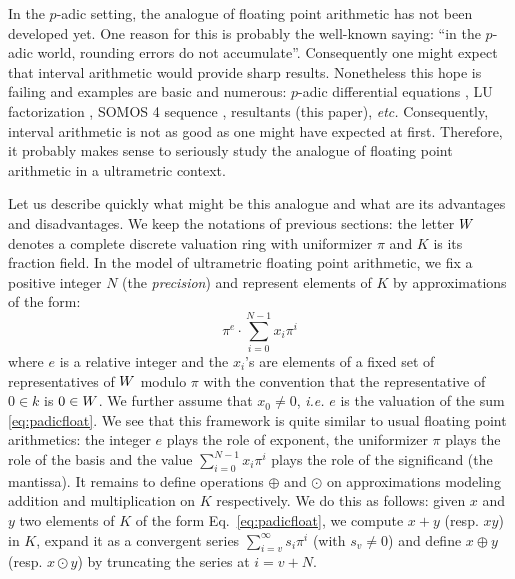 \documentclass{article}
\begin{document}
In the $p$-adic setting, the analogue of floating point arithmetic has 
not been developed yet. One reason for this is probably the well-known 
saying: ``in the $p$-adic world, rounding errors do not accumulate''. 
Consequently one might expect that interval arithmetic would provide 
sharp results. Nonetheless this hope is failing and examples are basic 
and numerous: $p$-adic differential equations \cite{bostan, padicdiff}, 
LU factorization \cite{LU}, SOMOS 4 sequence \cite{padicprec}, 
resultants (this paper), \emph{etc.} Consequently, interval arithmetic 
is not as good as one might have expected at first. Therefore, it 
probably makes sense to seriously study the analogue of floating point 
arithmetic in a ultrametric context.

Let us describe quickly what might be this analogue and what are its
advantages and disadvantages. We keep the notations of previous
sections: the letter $W$ denotes a complete discrete valuation ring
with uniformizer $\pi$ and $K$ is its fraction field.
In the model of ultrametric floating point arithmetic, we fix a
positive integer $N$ (the \emph{precision}) and represent elements 
of $K$ by approximations of the form:
\begin{equation}
\label{eq:padicfloat}
\pi^e \cdot \sum_{i=0}^{N-1} x_i \pi^i
\end{equation}
where $e$ is a relative integer and the $x_i$'s are elements of a fixed 
set of representatives of $W$ modulo $\pi$ with the convention that the 
representative of $0 \in k$ is $0 \in W$.
We further assume that $x_0 \neq 0$, \emph{i.e.} $e$ is the valuation
of the sum \eqref{eq:padicfloat}. We see that this framework is quite
similar to usual floating point arithmetics: the integer $e$ plays the
role of exponent, the uniformizer $\pi$ plays the role of the basis
and the value $\sum_{i=0}^{N-1} x_i \pi^i$ plays the role of the
significand (the mantissa). It remains to define operations $\oplus$
and $\odot$ on approximations modeling addition and multiplication
on $K$ respectively. We do this as follows: given $x$ and $y$ two
elements of $K$ of the form Eq.~\eqref{eq:padicfloat}, we compute
$x+y$ (resp. $xy$) in $K$, expand it as a convergent series 
$\sum_{i=v}^{\infty} s_i \pi^i$ (with $s_v \neq 0$) and define $x 
\oplus y$ (resp. $x \odot y$) by truncating the series at $i = v+N$.
\end{document}
